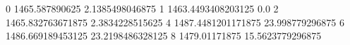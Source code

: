 0 1465.587890625 2.1385498046875
1 1463.4493408203125 0.0
2 1465.832763671875 2.3834228515625
4 1487.4481201171875 23.998779296875
6 1486.669189453125 23.2198486328125
8 1479.01171875 15.5623779296875
